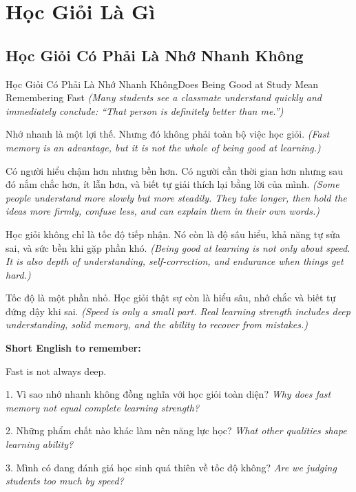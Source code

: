 \chapter{Học Giỏi Là Gì}

\section{Học Giỏi Có Phải Là Nhớ Nhanh Không}
\begin{truyen}{Học Giỏi Có Phải Là Nhớ Nhanh Không}{Does Being Good at Study Mean Remembering Fast}
\textit{(Many students see a classmate understand quickly and immediately conclude: “That person is definitely better than me.”)}

Nhớ nhanh là một lợi thế. Nhưng đó không phải toàn bộ việc học giỏi.
\textit{(Fast memory is an advantage, but it is not the whole of being good at learning.)}

Có người hiểu chậm hơn nhưng bền hơn. Có người cần thời gian hơn nhưng sau đó nắm chắc hơn, ít lẫn hơn, và biết tự giải thích lại bằng lời của mình.
\textit{(Some people understand more slowly but more steadily. They take longer, then hold the ideas more firmly, confuse less, and can explain them in their own words.)}

Học giỏi không chỉ là tốc độ tiếp nhận. Nó còn là độ sâu hiểu, khả năng tự sửa sai, và sức bền khi gặp phần khó.
\textit{(Being good at learning is not only about speed. It is also depth of understanding, self-correction, and endurance when things get hard.)}
\end{truyen}

\begin{baihoc}
Tốc độ là một phần nhỏ. Học giỏi thật sự còn là hiểu sâu, nhớ chắc và biết tự đứng dậy khi sai.
\textit{(Speed is only a small part. Real learning strength includes deep understanding, solid memory, and the ability to recover from mistakes.)}
\end{baihoc}

\begin{ghinhoanh}
\textbf{Short English to remember:}

Fast is not always deep.

\end{ghinhoanh}

\begin{tuhocnhanh}
1. Vì sao nhớ nhanh không đồng nghĩa với học giỏi toàn diện? \textit{Why does fast memory not equal complete learning strength?}

2. Những phẩm chất nào khác làm nên năng lực học? \textit{What other qualities shape learning ability?}

3. Mình có đang đánh giá học sinh quá thiên về tốc độ không? \textit{Are we judging students too much by speed?}
\end{tuhocnhanh}
\ngancach

